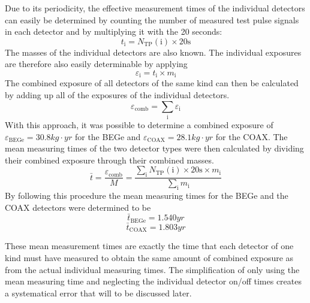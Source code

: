 \documentclass[encoding=utf8,british]{tumphthesis}
\begin{document}
Due to its periodicity, the effective measurement times of the individual detectors can easily be determined by counting the number of measured test pulse signals in each detector and by multiplying it with the 20 seconds:
\begin{equation}
    t_\mathrm{i} = N_{\mathrm{TP}}(\mathrm{i}) \times 20\mathrm{s}
\end{equation}
The masses of the individual detectors are also known.
The individual exposures are therefore also easily determinable by applying 
\begin{equation}
    \varepsilon_\mathrm{i} = t_\mathrm{i} \times m_\mathrm{i}
\end{equation}
The combined exposure of all detectors of the same kind can then be calculated by adding up all of the exposures of the individual detectors.  
\begin{equation}
    \varepsilon_{\mathrm{comb}} = \sum_\mathrm{i} \varepsilon_\mathrm{i}
\end{equation}
With this approach, it was possible to determine a combined exposure of $\varepsilon_{\mathrm{BEGe}} = 30.8 \unit{kg}\cdot \unit{yr}$ for the BEGe and $\varepsilon_{\mathrm{COAX}} = 28.1 \unit{kg}\cdot \unit{yr}  $ for the COAX.
The mean measuring times of the two detector types were then calculated by dividing their combined exposure through their combined masses. 
\begin{equation}
    \bar{t} = \frac{\varepsilon_{\mathrm{comb}}}{M} = \frac{\sum_\mathrm{i} N_{\mathrm{TP}}(\mathrm{i}) \times 20\mathrm{s} \times m_\mathrm{i}}{\sum_\mathrm{i} m_\mathrm{i}}
\end{equation}
By following this procedure the mean measuring times for the BEGe and the COAX detectors were determined to be
\begin{equation*}
   \bar{t}_{\mathrm{BEGe}} = 1.540 \unit{yr}  
\end{equation*}
\begin{equation*}
    \bar{t}_{\mathrm{COAX}} = 1.803 \unit{yr} 
\end{equation*}

These mean measurement times are exactly the time that each detector of one kind must have measured to obtain the same amount of combined exposure as from the actual individual measuring times.
The simplification of only using the mean measuring time and neglecting the individual detector on/off times creates a systematical error that will to be discussed later.
\\
\end{document}
